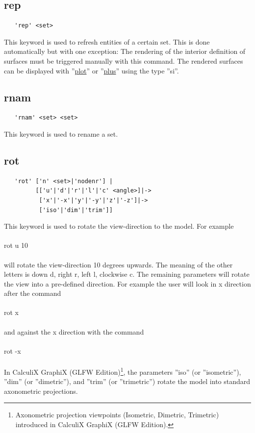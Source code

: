 \documentclass{article}
\providecommand{\htmlref}[2]{\hyperref[#2]{#1}}
\begin{document}
\subsection{\label{rep}rep}
\begin{verbatim}
   'rep' <set>  
\end{verbatim}
This keyword is used to refresh entities of a certain set. This is done automatically but with one exception: The rendering of the interior definition of surfaces must be triggered manually with this command. The rendered surfaces can be displayed with ''\htmlref{plot}{plot}'' or  ''\htmlref{plus}{plus}'' using the type ''si''.

\subsection{\label{rnam}rnam}
\begin{verbatim}
   'rnam' <set> <set>  
\end{verbatim}
This keyword is used to rename a set.

\subsection{\label{rot}rot}
\begin{verbatim}
   'rot' ['n' <set>|'nodenr'] |
         [['u'|'d'|'r'|'l'|'c' <angle>]|->
          ['x'|'-x'|'y'|'-y'|'z'|'-z']|->
          ['iso'|'dim'|'trim']]
\end{verbatim}
This keyword is used to rotate the view-direction to the model. For example\\\\rot u 10\\\\will rotate the view-direction 10 degrees upwards. The meaning of the other letters is down d, right r, left l, clockwise c. The remaining parameters will rotate the view into a pre-defined direction. For example the user will look in x direction after the command\\\\rot x\\\\and against the x direction with the command\\\\rot -x\\\\In CalculiX GraphiX (GLFW Edition)\footnote{Axonometric projection viewpoints (Isometric, Dimetric, Trimetric) introduced in CalculiX GraphiX (GLFW Edition).}, the parameters ''iso'' (or ''isometric''), ''dim'' (or ''dimetric''), and ''trim'' (or ''trimetric'') rotate the model into standard axonometric projections.
\end{document}
